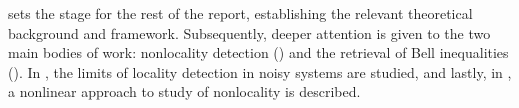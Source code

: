 


 sets the stage for the rest of the report, establishing the relevant theoretical background and framework. Subsequently, deeper attention is given to the two main bodies of work: nonlocality detection () and the retrieval of Bell inequalities (). In , the limits of locality detection in noisy systems are studied, and lastly, in , a nonlinear approach to study of nonlocality is described.